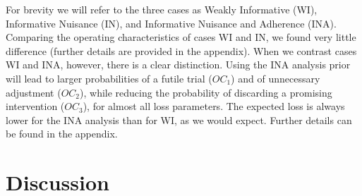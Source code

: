 \documentclass{article} %
\begin{document}
For brevity we will refer to the three cases as Weakly Informative (WI), Informative Nuisance (IN), and Informative Nuisance and Adherence (INA). Comparing the operating characteristics of cases WI and IN, we found very little difference (further details are provided in the appendix). When we contrast cases WI and INA, however, there is a clear distinction. Using the INA analysis prior will lead to larger probabilities of a futile trial ($OC_1$) and of unnecessary adjustment ($OC_2$), while reducing the probability of discarding a promising intervention ($OC_3$), for almost all loss parameters. The expected loss is always lower for the INA analysis than for WI, as we would expect. Further details can be found in the appendix.



\section{Discussion}\label{sec:discussion}



\end{document}
